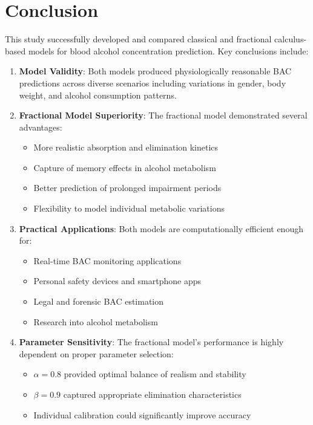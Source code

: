 \documentclass[11pt]{article}
\begin{document}
\section{Conclusion}

This study successfully developed and compared classical and fractional calculus-based models for blood alcohol concentration prediction. Key conclusions include:

\begin{enumerate}
    \item \textbf{Model Validity}: Both models produced physiologically reasonable BAC predictions across diverse scenarios including variations in gender, body weight, and alcohol consumption patterns.
    
    \item \textbf{Fractional Model Superiority}: The fractional model demonstrated several advantages:
    \begin{itemize}
        \item More realistic absorption and elimination kinetics
        \item Capture of memory effects in alcohol metabolism
        \item Better prediction of prolonged impairment periods
        \item Flexibility to model individual metabolic variations
    \end{itemize}
    
    \item \textbf{Practical Applications}: Both models are computationally efficient enough for:
    \begin{itemize}
        \item Real-time BAC monitoring applications
        \item Personal safety devices and smartphone apps
        \item Legal and forensic BAC estimation
        \item Research into alcohol metabolism
    \end{itemize}
    
    \item \textbf{Parameter Sensitivity}: The fractional model's performance is highly dependent on proper parameter selection:
    \begin{itemize}
        \item $\alpha = 0.8$ provided optimal balance of realism and stability
        \item $\beta = 0.9$ captured appropriate elimination characteristics
        \item Individual calibration could significantly improve accuracy
    \end{itemize}
    

\end{enumerate}
\end{document}
